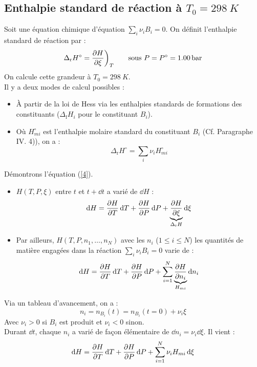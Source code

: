 \documentclass{article}
\let\oldref\ref
\renewcommand{\ref}[1]{(\oldref{#1})}
\newcommand{\ds}{\displaystyle}
\newcommand{\Dr}{\Delta_{\mathrm{r}}}
\newcommand{\Df}{\Delta_{\mathrm{f}}}
\begin{document}
\subsection{Enthalpie standard de réaction à $T_0 = \SI{298}{K}$}
\begin{tableau}
Soit une équation chimique d'équation $\sum_i \nu_iB_i = 0$. On définit l'enthalpie standard de réaction par :
$$\Dr H^\circ = \pdv{H}{\xi}\bigg)_T\qquad \text{sous $P=P^\circ = \SI{1,00}{bar}$}$$
On calcule cette grandeur à $T_0 = \SI{298}{K}$.\\
Il y a deux modes de calcul possibles :
\begin{itemize}
    \item À partir de la loi de Hess via les enthalpies standards de formations des constituants ($\Df H_i$ pour le constituant $B_i$).
    \item Où $H_{mi}^\circ$ est l'enthalpie molaire standard du constituant $B_i$ (Cf. Paragraphe \textsf{IV. 4)}), on a :
    \begin{equation}\label{4}
        \ds\Dr H^\circ = \sum_i \nu_i H_{mi}^\circ
    \end{equation}
\end{itemize}
Démontrons l'équation \ref{4}.
\begin{itemize}
    \item $H(T,P,\xi)$ entre $t$ et $t+\dd{t}$ a varié de $\dd{H}$ :
    \begin{equation}\label{5}
        \dd{H}=\pdv{H}{T}\dd{T} + \pdv{H}{P}\dd{P} + \underbrace{\pdv{H}{\xi}}_{\Dr H}\dd{\xi} 
    \end{equation}
    \item Par ailleurs, $H(T,P,n_1,\dots,n_N)$ avec les $n_i$ ($1\leq i \leq N$) les quantités de matière engagées dans la réaction $\sum_i \nu_iB_i=0$ varie de :
    \begin{equation*}
        \dd{H}=\pdv{H}{T}\dd{T} + \pdv{H}{P}\dd{P} +\sum_{i=1}^N \underbrace{\pdv{H}{n_i}}_{H_{mi}}\dd{n_i} 
    \end{equation*}
\end{itemize}
Via un tableau d'avancement, on a :
$$n_i = n_{B_i}(t) = n_{B_i}(t=0)+\nu_i\xi$$
Avec $\nu_i>0$ si $B_i$ est produit et $\nu_i<0$ sinon.\\
Durant $\dd{t}$, chaque $n_i$ a varié de façon élémentaire de $\dd{n_i} = \nu_i \dd{\xi}$. Il vient :
\begin{equation}\label{6}
    \dd{H}=\pdv{H}{T}\dd{T} + \pdv{H}{P}\dd{P} +\sum_{i=1}^N \nu_i H_{mi} \dd{\xi}
\end{equation}


\end{tableau}
\end{document}
